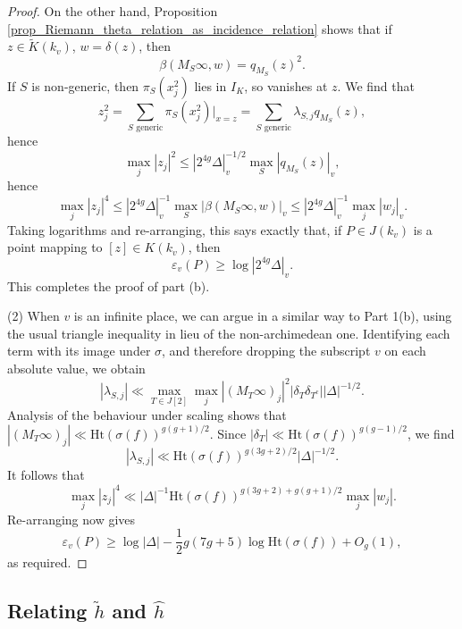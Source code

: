 \documentclass{article} %
\numberwithin{equation}{section}
\newcommand{\height}{\mathrm{Ht}}
\begin{document}
\begin{proof}
    On the other hand, Proposition \ref{prop_Riemann_theta_relation_as_incidence_relation} shows that if $z \in \widetilde{K}(k_v)$, $w = \delta(z)$, then
    \[ \beta(M_S \infty, w) = q_{M_S}(z)^2. \]
    If $S$ is non-generic, then $\pi_S(x_j^2)$ lies in $I_K$, so vanishes at $z$. We find that
    \[ z_j^2 = \sum_{S \text{ generic}} \pi_S(x_j^2)|_{x = z} = \sum_{S \text{ generic}} \lambda_{S, j} q_{M_S}(z), \]
    hence 
    \[ \max_j |z_j|^2 \leq | 2^{4g} \Delta |_v^{-1/2} \max_S |q_{M_S}(z)|_v, \]
    hence
    \[ \max_j |z_j|^4 \leq |2^{4g} \Delta|_v^{-1} \max_S |\beta( M_S \infty,w)|_v \leq |2^{4g} \Delta|_v^{-1} \max_j |w_j|_v. \]
    Taking logarithms and re-arranging, this says exactly that, if $P \in J(k_v)$ is a point mapping to $[z] \in K(k_v)$, then
    \[ \varepsilon_v(P) \geq \log |2^{4g} \Delta|_v. \]
    This completes the proof of part (b).

    (2) When $v$ is an infinite place, we can argue in a similar way to Part 1(b), using the usual triangle inequality in lieu of the non-archimedean one.
    Identifying each term with its image under $\sigma$, and therefore dropping the subscript $v$ on each absolute value, we obtain
    \[ | \lambda_{S, j} | \ll \max_{T \in J[2]} \max_j | (M_T \infty)_j |^2 |\delta_T \delta_{T^c}| |\Delta|^{-1/2}.  \]
    Analysis of the behaviour under scaling shows that $| (M_T \infty)_j | \ll \height(\sigma(f))^{g(g+1)/2}$. Since $|\delta_T| \ll \height(\sigma(f))^{g(g-1)/2}$, we find 
    \[ | \lambda_{S, j} | \ll \height(\sigma(f))^{g(3g+2)/2} |\Delta|^{-1/2}. \]
    It follows that
    \[ \max_j | z_j |^4 \ll |\Delta|^{-1} \height(\sigma(f))^{g(3g+2) + g(g+1)/2} \max_j | w_j |. \]
    Re-arranging now gives
    \[ \varepsilon_v(P) \geq \log | \Delta | - \frac{1}{2} g(7g+5) \log \height(\sigma(f))  + O_g(1), \]
    as required. 
\end{proof}

\subsection{Relating $\widetilde{h}$ and $\widehat{h}$}
\end{document}
